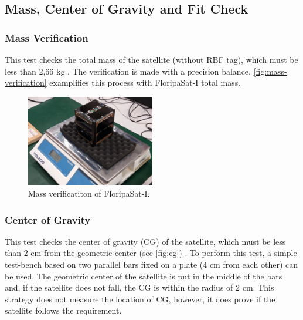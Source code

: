 \subsection{Mass, Center of Gravity and Fit Check}

\subsubsection{Mass Verification}

This test checks the total mass of the satellite (without RBF tag), which must be less than 2,66 kg \cite{cds}. The verification is made with a precision balance. \autoref{fig:mass-verification} examplifies this process with FloripaSat-I total mass.

\begin{figure}[!ht]
    \begin{center}
        \includegraphics[width=0.5\textwidth]{figures/mass-test}
        \caption{Mass verificatiton of FloripaSat-I.}
        \label{fig:mass-verification}
    \end{center}
\end{figure}

\subsubsection{Center of Gravity}

This test checks the center of gravity (CG) of the satellite, which must be less than 2 cm from the geometric center (see \autoref{fig:cg}) \cite{cds}. To perform this test, a simple test-bench based on two parallel bars fixed on a plate (4 cm from each other) can be used. The geometric center of the satellite is put in the middle of the bars and, if the satellite does not fall, the CG is within the radius of 2 cm. This strategy does not measure the location of CG, however, it does prove if the satellite follows the requirement.


